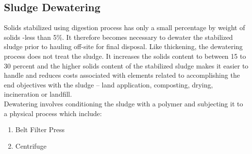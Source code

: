 \subsection{Sludge Dewatering}
Solids stabilized using digestion process has only a small percentage by weight of solids -less than 5\%.  It therefore becomes necessary to dewater the stabilized sludge prior to hauling off-site for final disposal.  Like thickening, the dewatering process does not treat the sludge.  It increases the solids content to between 15 to 30 percent and the higher solids content of the stabilized sludge makes it easier to handle and reduces costs associated with elements related to accomplishing the end objectives with the sludge – land application, composting, drying, incineration or landfill.\\
Dewatering involves conditioning the sludge with a polymer and subjecting it to a physical process which include:
\begin{enumerate}
\item Belt Filter Press 
\item Centrifuge
\end{enumerate}
\newpage
